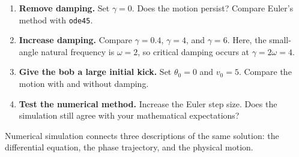 \documentclass[10pt,letterpaper]{article}
\begin{document}
\begin{enumerate}
    \item \textbf{Remove damping.}
    Set $\gamma=0$. Does the motion persist?
    Compare Euler's method with \texttt{ode45}.

    \item \textbf{Increase damping.}
    Compare $\gamma=0.4$, $\gamma=4$, and $\gamma=6$.
    Here, the small-angle natural frequency is
    $\omega=2$, so critical damping occurs at
    $\gamma=2\omega=4$.

    \item \textbf{Give the bob a large initial kick.}
    Set $\theta_0=0$ and $v_0=5$.
    Compare the motion with and without damping.

    \item \textbf{Test the numerical method.}
    Increase the Euler step size.
    Does the simulation still agree with your
    mathematical expectations?
\end{enumerate}

Numerical simulation connects three descriptions
of the same solution: the differential equation,
the phase trajectory, and the physical motion.
\end{document}
